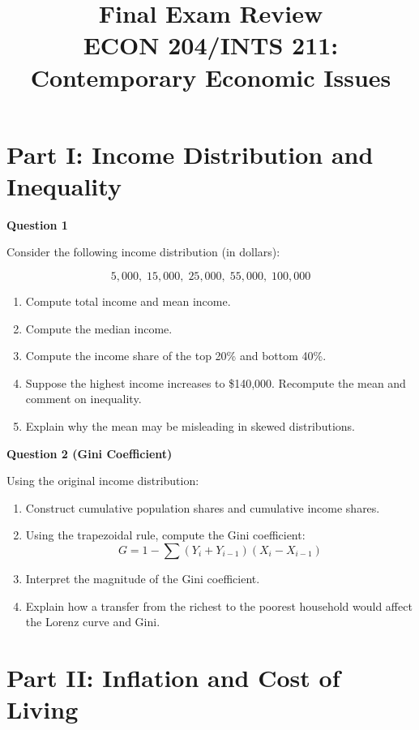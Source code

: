 \documentclass[12pt]{article}
\title{\textbf{Final Exam Review}\\
ECON 204/INTS 211: Contemporary Economic Issues}
\date{}
\begin{document}
\maketitle

\section*{Part I: Income Distribution and Inequality}

\textbf{Question 1}

Consider the following income distribution (in dollars):

\[
5{,}000,\; 15{,}000,\; 25{,}000,\; 55{,}000,\; 100{,}000
\]

\begin{enumerate}[label=(\alph*)]
\item Compute total income and mean income.
\item Compute the median income.
\item Compute the income share of the top 20\% and bottom 40\%.
\item Suppose the highest income increases to \$140,000. Recompute the mean and comment on inequality.
\item Explain why the mean may be misleading in skewed distributions.
\end{enumerate}

\vspace{1em}

\textbf{Question 2 (Gini Coefficient)}

Using the original income distribution:

\begin{enumerate}[label=(\alph*)]
\item Construct cumulative population shares and cumulative income shares.
\item Using the trapezoidal rule, compute the Gini coefficient:
\[
G = 1 - \sum (Y_i + Y_{i-1})(X_i - X_{i-1})
\]
\item Interpret the magnitude of the Gini coefficient.
\item Explain how a transfer from the richest to the poorest household would affect the Lorenz curve and Gini.
\end{enumerate}

\section*{Part II: Inflation and Cost of Living}
\end{document}
